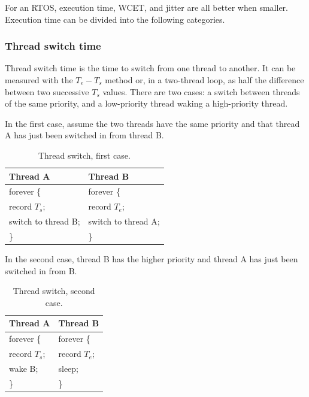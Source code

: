 For an RTOS, execution time, WCET, and jitter are all better when smaller.
Execution time can be divided into the following categories.

\subsubsection{Thread switch time}

Thread switch time is the time to switch from one thread to another.
It can be measured with the \(T_e-T_s\) method or, in a two-thread loop, as half the difference between two successive \(T_s\) values.
There are two cases: a switch between threads of the same priority, and a low-priority thread waking a high-priority thread.

In the first case, assume the two threads have the same priority and that thread A has just been switched in from thread B.

\begin{table}[htbp]
    \centering
    \caption{Thread switch, first case.}
    \small
    \begin{tabular}{@{}p{}p{}@{}}
        \toprule
        Thread A & Thread B\\
        \midrule
        forever \{ & forever \{ \\ \quad record \(T_s\); & \quad record \(T_e\); \\ \quad switch to thread B; & \quad switch to thread A; \\ \} & \}\\
        \bottomrule
    \end{tabular}
\end{table}

In the second case, thread B has the higher priority and thread A has just been switched in from B.

\begin{table}[htbp]
    \centering
    \caption{Thread switch, second case.}
    \small
    \begin{tabular}{@{}p{}p{}@{}}
        \toprule
        Thread A & Thread B\\
        \midrule
        forever \{ & forever \{ \\ \quad record \(T_s\); & \quad record \(T_e\); \\ \quad wake B; & \quad sleep; \\ \} & \}\\
        \bottomrule
    \end{tabular}
\end{table}

